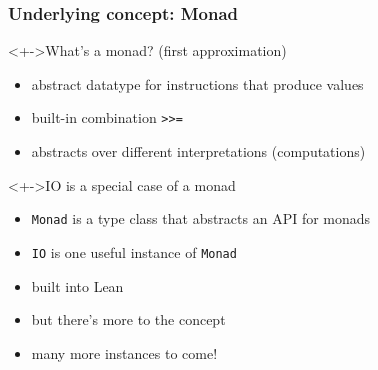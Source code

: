 \documentclass{beamer}
\begin{document}
\begin{frame}
  \frametitle{Underlying concept: \textbf{Monad}}

  \begin{block}<+->{What's a monad? (first approximation)}
    \begin{itemize}
    \item abstract datatype for instructions that produce values
    \item built-in combination \texttt{>>=}
    \item abstracts over different interpretations (computations)
    \end{itemize}
  \end{block}
  \begin{alertblock}<+->{IO is a special case of a monad}
    \begin{itemize}
    \item \lstinline{Monad} is a type class that abstracts an API for monads
    \item \lstinline{IO} is one useful instance of \lstinline{Monad}
    \item built into Lean
    \item but there's more to the concept
    \item many more instances to come!
    \end{itemize}
  \end{alertblock}
\end{frame}


\end{document}

